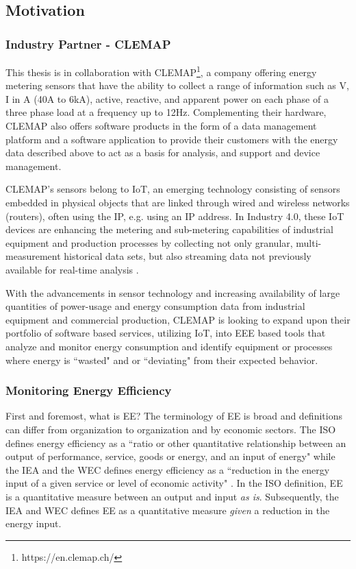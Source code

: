 \subsection{Motivation}

\subsubsection{Industry Partner - CLEMAP}
This thesis is in collaboration with \ac{CLEMAP}\footnote[1]{https://en.clemap.ch/}, a company offering energy metering sensors that have the ability to collect a range of information such as \ac{V}, \ac{I} in \ac{A} (40A to 6kA), active, reactive, and apparent power on each phase of a three phase load at a frequency up to 12\ac{Hz}. Complementing their hardware, CLEMAP also offers software products in the form of a data management platform and a software application to provide their customers with the energy data described above to act as a basis for analysis, and support and device management.

CLEMAP’s sensors belong to \ac{IoT}, an emerging technology consisting of sensors embedded in physical objects that are linked through wired and wireless networks (routers), often using the \ac{IP}, e.g. using an IP address. In Industry 4.0, these IoT devices are enhancing the metering and sub-metering capabilities of industrial equipment and production processes by collecting not only granular, multi-measurement historical data sets, but also streaming data not previously available for real-time analysis \cite{iot-1}.

With the advancements in sensor technology and increasing availability of large quantities of power-usage and energy consumption data from industrial equipment and commercial production, CLEMAP is looking to expand upon their portfolio of software based services, utilizing IoT, into \ac{EEE} based tools that analyze and monitor energy consumption and identify equipment or processes where energy is ``wasted" and or ``deviating" from their expected behavior.

\subsubsection{Monitoring Energy Efficiency}

First and foremost, what is \ac{EE}? The terminology of EE is broad and definitions can differ from organization to organization and by economic sectors. The \ac{ISO} defines energy efficiency as a ``ratio or other quantitative relationship between an output of performance, service, goods or energy, and an input of energy" \cite{ISO} while the \ac{IEA} and the \ac{WEC} defines energy efficiency as a ``reduction in the energy input of a given service or level of economic activity" \cite{iea-wec}. In the ISO definition, EE is a quantitative measure between an output and input \textit{as is}. Subsequently, the IEA and WEC defines EE as a quantitative measure \textit{given} a reduction in the energy input.

